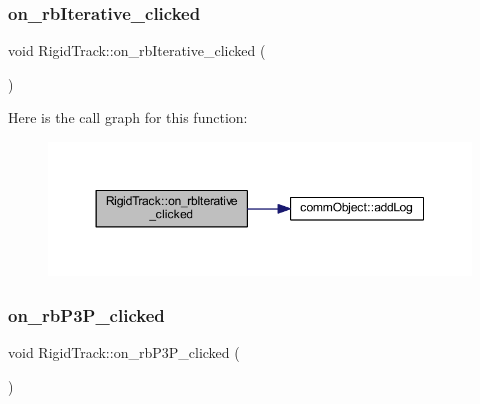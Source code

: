 \subsubsection{\texorpdfstring{on\+\_\+rb\+Iterative\+\_\+clicked}{on\_rbIterative\_clicked}}
{\footnotesize\ttfamily void Rigid\+Track\+::on\+\_\+rb\+Iterative\+\_\+clicked (\begin{DoxyParamCaption}{ }\end{DoxyParamCaption})\hspace{0.3cm}{\ttfamily [slot]}}

Here is the call graph for this function\+:\nopagebreak
\begin{figure}[H]
\begin{center}
\leavevmode
\includegraphics[width=350pt]{class_rigid_track_ae5bcdd3fb7203b4a7d1fa97c1460af31_cgraph}
\end{center}
\end{figure}
\mbox{\label{class_rigid_track_ac1f10ea5ec3f718c152e245a04776454}} 
\subsubsection{\texorpdfstring{on\+\_\+rb\+P3\+P\+\_\+clicked}{on\_rbP3P\_clicked}}
{\footnotesize\ttfamily void Rigid\+Track\+::on\+\_\+rb\+P3\+P\+\_\+clicked (\begin{DoxyParamCaption}{ }\end{DoxyParamCaption})\hspace{0.3cm}{\ttfamily [slot]}}

